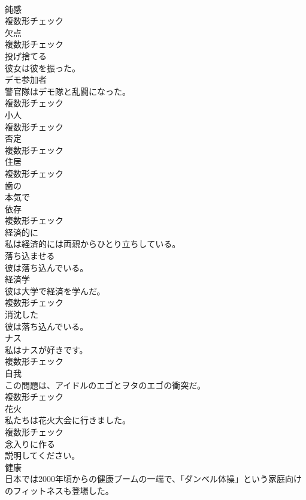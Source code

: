 \documentclass[8pt]{extreport}
\begin{document}
\begin{CJK}{UTF8}{min}
\\	[名詞]	鈍感	
\\	複数形チェック
\\	[名詞]	欠点	
\\	複数形チェック
\\	[動詞]	投げ捨てる	
\\	彼女は彼を振った。	
\\	[名詞]	デモ参加者	
\\	警官隊はデモ隊と乱闘になった。	
\\	複数形チェック
\\	[名詞]	小人	
\\	複数形チェック
\\	[名詞]	否定	
\\	複数形チェック
\\	[名詞]	住居	
\\	複数形チェック
\\	[形容詞]	⻭の	
\\	[副詞]	本気で	
\\	[名詞]	依存	
\\	複数形チェック
\\	[副詞]	経済的に	
\\	私は経済的には両親からひとり立ちしている。	
\\	[動詞]	落ち込ませる	
\\	彼は落ち込んでいる。	
\\	[名詞]	経済学	
\\	彼は大学で経済を学んだ。	
\\	複数形チェック
\\	[形容詞]	消沈した	
\\	彼は落ち込んでいる。	
\\	[名詞]	ナス	
\\	私はナスが好きです。	
\\	複数形チェック
\\	[名詞]	自我	
\\	この問題は、アイドルのエゴとヲタのエゴの衝突だ。	
\\	複数形チェック
\\	[名詞]	花火	
\\	私たちは花火大会に行きました。	
\\	複数形チェック
\\	[動詞]	念入りに作る	
\\	説明してください。	
\\	[名詞]	健康	
\\	日本では2000年頃からの健康ブームの一端で、「ダンベル体操」という家庭向けのフィットネスも登場した。	

\end{CJK}
\end{document}
